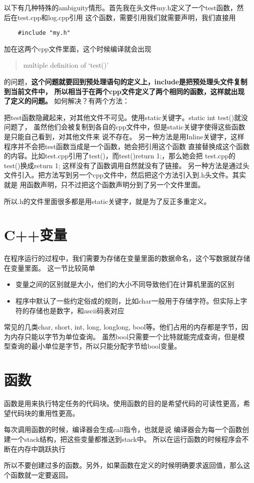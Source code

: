 \documentclass{article}
\begin{document}
\begin{sloppypar}
以下有几种特殊的ambiguity情形。首先我在头文件my.h定义了一个test函数，然后在test.cpp和log.cpp引用
这个函数，需要引用我们就需要声明，我们直接用
\begin{lstlisting}
	#include "my.h"
\end{lstlisting}
加在这两个cpp文件里面，这个时候编译就会出现
\begin{quotation}
	multiple definition of `test()'
\end{quotation}
的问题，\textbf{这个问题就要回到预处理语句的定义上，include是把预处理头文件复制到当前文件中，
所以相当于在两个cpp文件定义了两个相同的函数，这样就出现了定义的问题。}
如何解决？有两个方法：
\begin{outline}
	\1 把test函数隐藏起来，对其他文件不可见。使用static关键字。static int test()就没问题了，
	虽然他们会被复制到各自的cpp文件中，但是static关键字使得这些函数是只能自己看到，对其他文件来
	说不存在。
		\2 另一种方法是用Inline关键字，这样程序并不会把test函数当成是一个函数，她会把引用这个函数
		直接替换成这个函数的内容。比如test.cpp引用了test()，而test(){return 1;}，那么她会把
		test.cpp的test()换成return 1; 这样没有了函数调用自然就没有了链接。
	\1 另一种方法是通过头文件引入。把方法写到另一个cpp文件中，然后把这个方法引入到.h头文件。其实就是
	用函数声明，只不过把这个函数声明分到了另一个文件里面。
\end{outline}
所以.h的文件里面很多都是用static关键字，就是为了反正多重定义。

\section{C++变量}
在程序运行的过程中，我们需要为存储在变量里面的数据命名，这个写数据就存储在变量里面。
这一节比较简单
\begin{itemize}
	\item 变量之间的区别就是大小，他们的大小不同导致他们在计算机里面的区别
	\item 程序中默认了一些约定俗成的规则，比如char一般用于存储字符。但实际上字符的存储也是数字，和ascii码表对应
\end{itemize}
常见的几类char, short, int, long, longlong, bool等。他们占用的内存都是字节，因为内存只能以字节为单位查询。
虽然bool只需要一个比特就能完成查询，但是模型查询的最小单位是字节，所以只能分配字节给bool变量。

\section{函数}
函数是用来执行特定任务的代码块。使用函数的目的是希望代码的可读性更高，希望代码块的重用性更高。
\begin{outline}
	\1 每次调用函数的时候，编译器会生成call指令，也就是说
	编译器会为每一个函数创建一个stack结构，把这些变量都推送到stack中。
	\1 所以在运行函数的时候程序会不断在内存中跳跃执行
\end{outline}
所以不要创建过多的函数。另外，如果函数在定义的时候明确要求返回值，那么这个函数就一定要返回。


\end{sloppypar}
\end{document}
